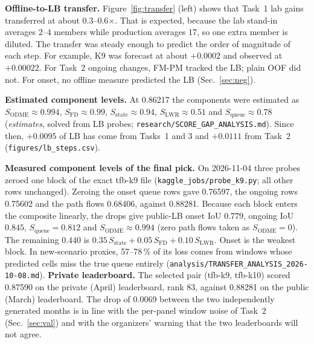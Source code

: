 \documentclass[conference,10pt]{IEEEtran}
\newcommand{\file}[1]{\texttt{\small #1}}
\begin{document}
\textbf{Offline-to-LB transfer.} Figure~\ref{fig:transfer} (left) shows that Task~1 lab gains transferred at about 0.3--0.6$\times$. That is
expected, because the lab stand-in averages 2--4 members while production averages 17, so one extra member is diluted. The
transfer was steady enough to predict the order of magnitude of each step. For example, K9 was forecast at about $+0.0002$ and observed at
$+0.00022$. For Task~2 ongoing changes, FM-PM tracked the LB; plain OOF did not. For onset, no offline measure
predicted the LB (Sec.~\ref{sec:neg}).

\textbf{Estimated component levels.} At 0.86217 the components were estimated as $S_\text{ODME}\approx0.994$,
$S_\text{FD}\approx0.99$, $S_\text{state}\approx0.94$, $S_\text{LWR}\approx0.51$ and $S_\text{queue}\approx0.78$ (\emph{estimates}, solved from LB probes;
\file{research/SCORE\_GAP\_ANALYSIS.md}). Since then, $+0.0095$ of LB has come from Tasks~1 and 3 and $+0.0111$ from Task~2 (\file{figures/lb\_steps.csv}).

\textbf{Measured component levels of the final pick.} On 2026-11-04 three probes zeroed one block of the exact tfb-k9 file
(\file{kaggle\_jobs/probe\_k9.py}; all other rows unchanged). Zeroing the onset queue rows gave 0.76597, the ongoing rows 0.75602 and the
path flows 0.68406, against 0.88281. Because each block enters the composite linearly, the drops give public-LB onset IoU $0.779$,
ongoing IoU $0.845$, $S_\text{queue}=0.812$ and $S_\text{ODME}\approx0.994$ (zero path flows taken as $S_\text{ODME}=0$). The remaining
$0.440$ is $0.35\,S_\text{state}+0.05\,S_\text{FD}+0.10\,S_\text{LWR}$. Onset is the weakest block. In new-scenario proxies, 57--78\,\% of its loss comes from windows whose predicted cells miss the
true queue entirely (\file{analysis/TRANSFER\_ANALYSIS\_2026-10-08.md}). \textbf{Private leaderboard.} The selected pair (tfb-k9, tfb-k10) scored 0.87590 on the private (April) leaderboard, rank 83, against 0.88281 on the public (March) leaderboard. The drop of 0.0069 between the two independently generated months is in line with the per-panel window noise of Task~2 (Sec.~\ref{sec:val}) and with the organizers' warning that the two leaderboards will not agree.
\end{document}
